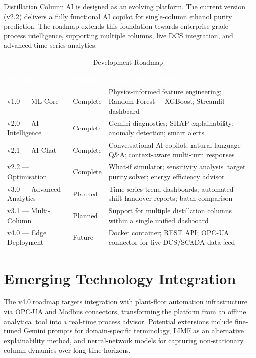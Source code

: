 \documentclass[12pt,a4paper]{report}
\newcommand{\thead}[1]{%
  \cellcolor{tabheader}\textcolor{white}{\textbf{#1}}%
}
\begin{document}
Distillation Column AI is designed as an evolving platform. The current version (v2.2)
delivers a fully functional AI copilot for single-column ethanol purity prediction.
The roadmap extends this foundation towards enterprise-grade process intelligence,
supporting multiple columns, live DCS integration, and advanced time-series analytics.

\begin{table}[H]
\centering
\caption{Development Roadmap}
\label{tab:roadmap}
\renewcommand{\arraystretch}{1.4}
\begin{tabularx}{\textwidth}{|L{3cm}|C{2cm}|L{9cm}|}
\hline
\thead{Version} & \thead{Status} & \thead{Scope and Features} \\
\hline
v1.0 --- ML Core          & Complete  & Physics-informed feature engineering; Random Forest + XGBoost; Streamlit dashboard \\
v2.0 --- AI Intelligence  & Complete  & Gemini diagnostics; SHAP explainability; anomaly detection; smart alerts \\
v2.1 --- AI Chat          & Complete  & Conversational AI copilot; natural-language Q\&A; context-aware multi-turn responses \\
v2.2 --- Optimisation     & Complete  & What-if simulator; sensitivity analysis; target purity solver; energy efficiency advisor \\
v3.0 --- Advanced Analytics & Planned & Time-series trend dashboards; automated shift handover reports; batch comparison \\
v3.1 --- Multi-Column     & Planned   & Support for multiple distillation columns within a single unified dashboard \\
v4.0 --- Edge Deployment  & Future    & Docker container; REST API; OPC-UA connector for live DCS/SCADA data feed \\
\hline
\end{tabularx}
\end{table}

\section{Emerging Technology Integration}

The v4.0 roadmap targets integration with plant-floor automation infrastructure via
OPC-UA and Modbus connectors, transforming the platform from an offline analytical
tool into a real-time process advisor. Potential extensions include fine-tuned Gemini
prompts for domain-specific terminology, LIME as an alternative explainability method,
and neural-network models for capturing non-stationary column dynamics over long
time horizons.
\end{document}
